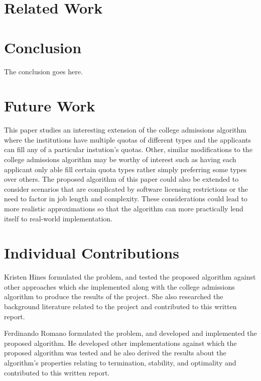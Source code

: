 \documentclass[conference]{IEEEtran}
\begin{document}
\section{Related Work}


\section{Conclusion}
The conclusion goes here.

\section{Future Work}
This paper studies an interesting extension of the college admissions
algorithm where the institutions have multiple quotas of different types
and the applicants can fill any of a particular instution's quotas.
Other, similar modifications to the college admissions algorithm 
may be worthy of interest such as having each applicant only able fill certain 
quota types rather 
simply preferring some types over others.
The proposed algorithm of this paper could also be extended to consider 
scenarios that are complicated by software licensing restrictions
or the need to factor in job length and complexity.
These considerations could lead to more realistic approximations 
so that the algorithm can more practically lend itself to 
real-world implementation.

\section{Individual Contributions}
Kristen Hines formulated the problem, 
and tested the proposed algorithm against other 
approaches which she implemented along with the 
college admissions algorithm to produce the 
results of the project.
She also researched the background literature related to the 
project and contributed to this written report.

Ferdinando Romano formulated the problem,
and developed and implemented the proposed algorithm.
He developed other implementations against which the
proposed algorithm was tested and
he also derived the results about the algorithm's properties 
relating to termination, stability, and optimality
and contributed to this written report.









\end{document}
